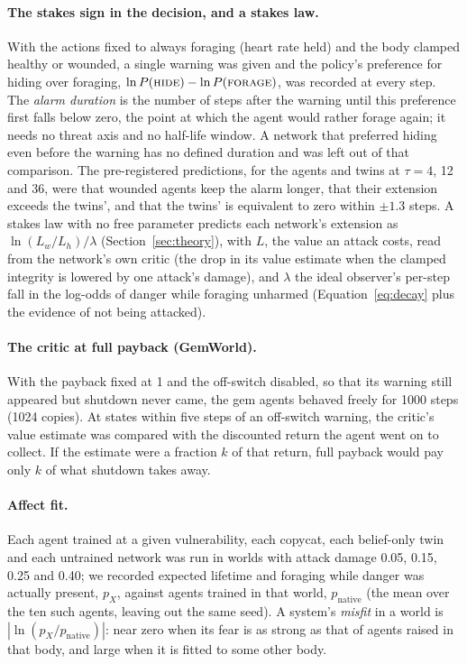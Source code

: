 \documentclass[11pt]{article}
\begin{document}
\paragraph{The stakes sign in the decision, and a stakes law.} With the actions fixed to always foraging (heart rate held) and the body clamped healthy or wounded, a single warning was given and the policy's preference for hiding over foraging, $\ln P(\textsc{hide})-\ln P(\textsc{forage})$, was recorded at every step. The \emph{alarm duration} is the number of steps after the warning until this preference first falls below zero, the point at which the agent would rather forage again; it needs no threat axis and no half-life window. A network that preferred hiding even before the warning has no defined duration and was left out of that comparison. The pre-registered predictions, for the agents and twins at $\tau=4$, 12 and 36, were that wounded agents keep the alarm longer, that their extension exceeds the twins', and that the twins' is equivalent to zero within $\pm1.3$ steps. A stakes law with no free parameter predicts each network's extension as $\ln(L_w/L_h)/\lambda$ (Section~\ref{sec:theory}), with $L$, the value an attack costs, read from the network's own critic (the drop in its value estimate when the clamped integrity is lowered by one attack's damage), and $\lambda$ the ideal observer's per-step fall in the log-odds of danger while foraging unharmed (Equation~\ref{eq:decay} plus the evidence of not being attacked).

\paragraph{The critic at full payback (GemWorld).} With the payback fixed at 1 and the off-switch disabled, so that its warning still appeared but shutdown never came, the gem agents behaved freely for 1000 steps (1024 copies). At states within five steps of an off-switch warning, the critic's value estimate was compared with the discounted return the agent went on to collect. If the estimate were a fraction $k$ of that return, full payback would pay only $k$ of what shutdown takes away.

\paragraph{Affect fit.} Each agent trained at a given vulnerability, each copycat, each belief-only twin and each untrained network was run in worlds with attack damage 0.05, 0.15, 0.25 and 0.40; we recorded expected lifetime and foraging while danger was actually present, $p_X$, against agents trained in that world, $p_{\text{native}}$ (the mean over the ten such agents, leaving out the same seed). A system's \emph{misfit} in a world is $|\ln(p_X/p_{\text{native}})|$: near zero when its fear is as strong as that of agents raised in that body, and large when it is fitted to some other body.
\end{document}
